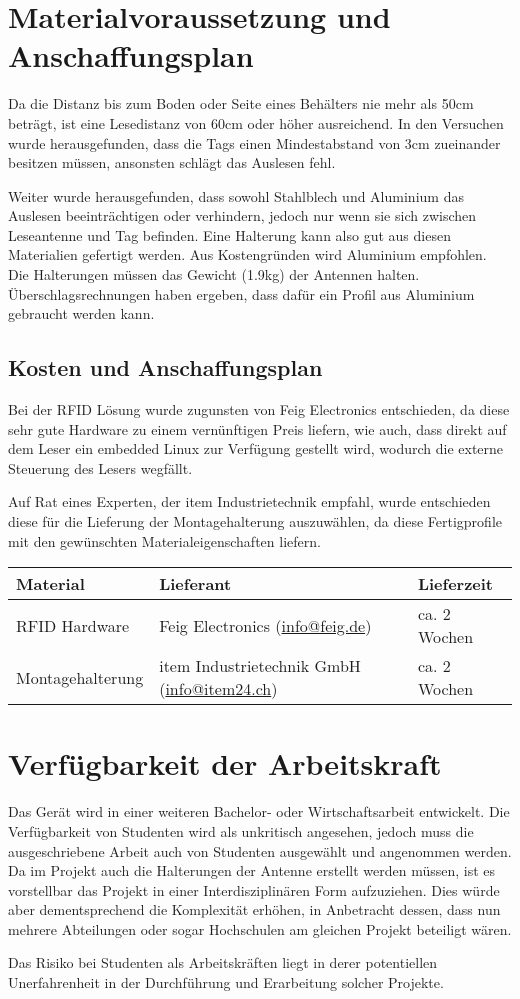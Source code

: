 \chapter{Materialvoraussetzung und Anschaffungsplan}
\label{sec:Materialvoraussetzung_Anschaffungsplan}
Da die Distanz bis zum Boden oder Seite eines Behälters nie mehr als 50cm beträgt, ist eine Lesedistanz von 60cm oder höher ausreichend. In den Versuchen wurde herausgefunden, dass die Tags einen Mindestabstand von 3cm zueinander besitzen müssen, ansonsten schlägt das Auslesen fehl.

Weiter wurde herausgefunden, dass sowohl Stahlblech und Aluminium das Auslesen beeinträchtigen oder verhindern, jedoch nur wenn sie sich zwischen Leseantenne und Tag befinden. Eine Halterung kann also gut aus diesen Materialien gefertigt werden. Aus Kostengründen wird Aluminium empfohlen. Die Halterungen müssen das Gewicht (1.9kg) der Antennen halten. Überschlagsrechnungen haben ergeben, dass dafür ein Profil aus Aluminium gebraucht werden kann.

\section{Kosten und Anschaffungsplan}
Bei der RFID Lösung wurde zugunsten von Feig Electronics entschieden, da diese sehr gute Hardware zu einem vernünftigen Preis liefern, wie auch, dass direkt auf dem Leser ein embedded Linux zur Verfügung gestellt wird, wodurch die externe Steuerung des Lesers wegfällt.

Auf Rat eines Experten, der item Industrietechnik empfahl, wurde entschieden diese für die Lieferung der Montagehalterung auszuwählen, da diese Fertigprofile mit den gewünschten Materialeigenschaften liefern.

\begin{table}[h!]
	\centering
	\begin{tabularx}{\textwidth}{|l|X|l|}
		\hline
		\textbf{Material} & \textbf{Lieferant} & \textbf{Lieferzeit} \\
		\hline
		RFID Hardware & Feig Electronics (\href{mailto:info@feig.de}{info@feig.de}) & ca. 2 Wochen\\
		\hline
		Montagehalterung & item Industrietechnik GmbH (\href{mailto:info@item24.ch}{info@item24.ch}) & ca. 2 Wochen\\
		\hline
	\end{tabularx}
\end{table}

\chapter{Verfügbarkeit der Arbeitskraft}
Das Gerät wird in einer weiteren Bachelor- oder Wirtschaftsarbeit entwickelt. Die Verfügbarkeit von Studenten wird als unkritisch angesehen, jedoch muss die ausgeschriebene Arbeit auch von Studenten ausgewählt und angenommen werden. Da im Projekt auch die Halterungen der Antenne erstellt werden müssen, ist es vorstellbar das Projekt in einer Interdisziplinären Form aufzuziehen. Dies würde aber dementsprechend die Komplexität erhöhen, in Anbetracht dessen, dass nun mehrere Abteilungen oder sogar Hochschulen am gleichen Projekt beteiligt wären.

Das Risiko bei Studenten als Arbeitskräften liegt in derer potentiellen Unerfahrenheit in der Durchführung und Erarbeitung solcher Projekte.
